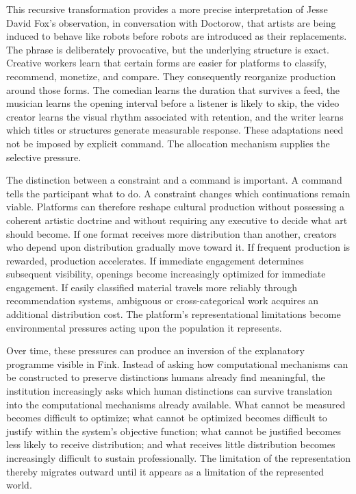 \documentclass[11pt]{article}
\begin{document}
This recursive transformation provides a more precise interpretation of Jesse David Fox's observation, in conversation with Doctorow, that artists are being induced to behave like robots before robots are introduced as their replacements. The phrase is deliberately provocative, but the underlying structure is exact. Creative workers learn that certain forms are easier for platforms to classify, recommend, monetize, and compare. They consequently reorganize production around those forms. The comedian learns the duration that survives a feed, the musician learns the opening interval before a listener is likely to skip, the video creator learns the visual rhythm associated with retention, and the writer learns which titles or structures generate measurable response. These adaptations need not be imposed by explicit command. The allocation mechanism supplies the selective pressure.

The distinction between a constraint and a command is important. A command tells the participant what to do. A constraint changes which continuations remain viable. Platforms can therefore reshape cultural production without possessing a coherent artistic doctrine and without requiring any executive to decide what art should become. If one format receives more distribution than another, creators who depend upon distribution gradually move toward it. If frequent production is rewarded, production accelerates. If immediate engagement determines subsequent visibility, openings become increasingly optimized for immediate engagement. If easily classified material travels more reliably through recommendation systems, ambiguous or cross-categorical work acquires an additional distribution cost. The platform's representational limitations become environmental pressures acting upon the population it represents.

Over time, these pressures can produce an inversion of the explanatory programme visible in Fink. Instead of asking how computational mechanisms can be constructed to preserve distinctions humans already find meaningful, the institution increasingly asks which human distinctions can survive translation into the computational mechanisms already available. What cannot be measured becomes difficult to optimize; what cannot be optimized becomes difficult to justify within the system's objective function; what cannot be justified becomes less likely to receive distribution; and what receives little distribution becomes increasingly difficult to sustain professionally. The limitation of the representation thereby migrates outward until it appears as a limitation of the represented world.
\end{document}
